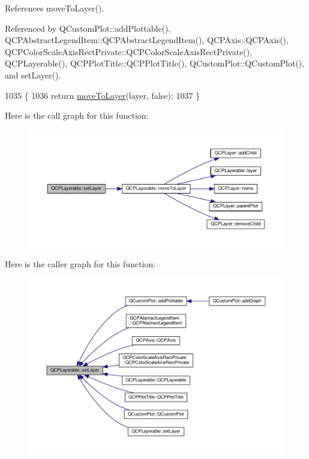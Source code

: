 References move\+To\+Layer().



Referenced by Q\+Custom\+Plot\+::add\+Plottable(), Q\+C\+P\+Abstract\+Legend\+Item\+::\+Q\+C\+P\+Abstract\+Legend\+Item(), Q\+C\+P\+Axis\+::\+Q\+C\+P\+Axis(), Q\+C\+P\+Color\+Scale\+Axis\+Rect\+Private\+::\+Q\+C\+P\+Color\+Scale\+Axis\+Rect\+Private(), Q\+C\+P\+Layerable(), Q\+C\+P\+Plot\+Title\+::\+Q\+C\+P\+Plot\+Title(), Q\+Custom\+Plot\+::\+Q\+Custom\+Plot(), and set\+Layer().


\begin{DoxyCode}
1035                                            \{
1036   \textcolor{keywordflow}{return} \hyperlink{class_q_c_p_layerable_af94484cfb7cbbddb7de522e9be71d9a4}{moveToLayer}(layer, \textcolor{keyword}{false});
1037 \}
\end{DoxyCode}


Here is the call graph for this function\+:\nopagebreak
\begin{figure}[H]
\begin{center}
\leavevmode
\includegraphics[width=350pt]{class_q_c_p_layerable_ab0d0da6d2de45a118886d2c8e16d5a54_cgraph}
\end{center}
\end{figure}




Here is the caller graph for this function\+:\nopagebreak
\begin{figure}[H]
\begin{center}
\leavevmode
\includegraphics[width=350pt]{class_q_c_p_layerable_ab0d0da6d2de45a118886d2c8e16d5a54_icgraph}
\end{center}
\end{figure}


